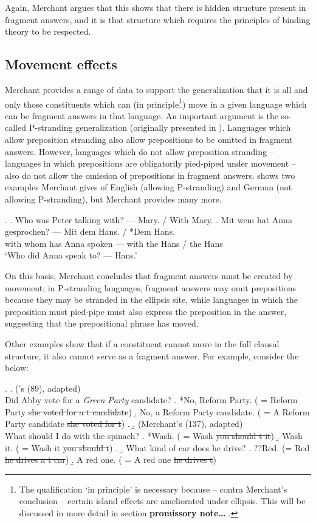 \documentclass[doublespace]{umthesis}
\newcommand{\el}[1]{\sout{#1}}
\begin{document}
Again, Merchant argues that this shows that there is hidden structure present in fragment answers, and it is that structure which requires the principles of binding theory to be respected.

\subsection{Movement effects}

Merchant provides a range of data to support the generalization that  it is all and only those constituents which can (in principle\footnote{The qualification `in principle' is necessary because -- contra Merchant's conclusion -- certain island effects are ameliorated under ellipsis. This will be discussed in more detail in section {\bf promissory note\ldots}%
.}) move in a given language which can be fragment answers in that language. An important argument is the so-called P-stranding generalization (originally presented in \cite{Me01}). Languages which allow preposition stranding also allow prepositions to be omitted in fragment answers. However, languages which do not allow preposition stranding -- languages in which prepositions are obligatorily pied-piped under movement -- also do not allow the omission of prepositions in fragment answers. \Next shows two examples Merchant gives of English (allowing P-stranding) and German (not allowing P-stranding), but Merchant provides many more.

\ex. 		\a. Who was Peter talking with? --- Mary. / With Mary.
		\bg. Mit wem hat Anna gesprochen? --- Mit dem Hans. / *Dem Hans. \\
				with whom has Anna spoken --- with the Hans / the Hans \\
				`Who did Anna speak to? --- Hans.'

On this basis, Merchant concludes that fragment answers must be created by movement; in P-stranding languages, fragment answers may omit prepositions because they may be stranded in the ellipsis site, while languages in which the preposition must pied-pipe must also express the preposition in the answer, suggesting that the prepositional phrase has moved.

Other examples show that if a constituent cannot move in the full clausal structure, it also cannot serve as a fragment answer. For example, consider the below:

\ex. 		\a. 	(\cite{Me04}'s (89), adapted)\\
			Did Abby vote for a \emph{Green Party} candidate?
				\a. *No, Reform Party. ( = Reform Party \el{she voted for a t candidate})
				\b. No, a Reform Party candidate. ( = A Reform Party candidate \el{she voted for t})
				\z.
			\b. (Merchant's (137), adapted)\\
				What should I do with the spinach?
				\a. *Wash.	( = Wash \el{you should t it})
				\b. Wash it. ( = Wash it \el{you should t})
				\z. 
			\b. What kind of car does he drive?
				\a. ??Red. (= Red \el{he drives a t car})
				\b. A red one. ( = A red one \el{he drives t})
				
\end{document}
